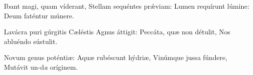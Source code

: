 Ibant magi, quam víderant,
Stellam sequéntes prǽviam:
Lumen requírunt lúmine:
Deum faténtur múnere.

Lavácra puri gúrgitis
Cæléstis Agnus áttigit:
Peccáta, quæ non détulit,
Nos abluéndo sústulit.

Novum genus poténtiæ:
Aquæ rubéscunt hýdriæ,
Vinúmque jussa fúndere,
Mutávit un-d\textit{a} oríginem.

